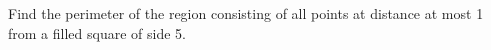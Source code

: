 Find the perimeter of the region consisting of all points at distance at most 1 from a filled square of side 5.
